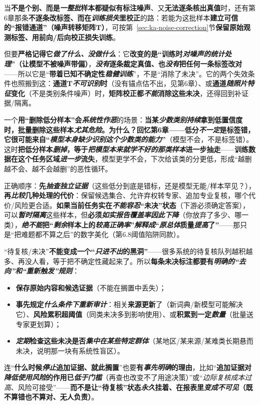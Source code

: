 当\textbf{不是个别、而是\emph{一整批}样本都疑似有标注噪声}、又\textbf{无法逐条核出真值}时，还有第6章那条\textbf{不逐条改标签、而在\emph{训练损失}里校正}的路：若能为这批样本\textbf{建立可信的“报错通道”（噪声转移矩阵$\bm T$）}，可按第~\ref{sec:ka-noise-correction}节\textbf{保留原始观测标签、用前向/后向校正损失训练}。

但要\textbf{严格记得它\emph{做了什么、没做什么}}：它\textbf{改变的是“训练时\emph{对噪声的\emph{统计处理}}”（让模型不被噪声带偏）}，\textbf{\emph{没有}逐条裁定真值、也\emph{没有}把任何一条标签改对}——所以它是“\textbf{带着已知不确定性\emph{稳健训练}}”，不是“消除了未决”。它的两个失效条件也照搬到这：\textbf{通道$\bm T$\emph{不可识别}时}（没有锚点估不出，见第6章）、或\textbf{通道\emph{随照片特征}变化}（不是类别条件噪声）时，\textbf{矩阵校正都\emph{不能}消除这些未决}，还得回到补证据/隔离。

一个\textbf{用“删除低分样本”会\emph{系统性作恶}}的场景：\textbf{当某\emph{少数类别}\emph{持续}拿到低置信度时，\textbf{批量删除这些样本\emph{尤其危险}}。为什么？回忆第6章——\textbf{低分\emph{不一定}是标签错}，它\textbf{很可能来自“\emph{模型本身\emph{缺少}识别这个少数类的能力}}”}（模型不会，不是标签错）。这时\textbf{把低分样本\emph{删掉}，等于\emph{把模型\emph{本来就学不好}的那类样本}进一步抽走}——\textbf{训练数据在这个任务区域\emph{进一步}流失}，模型更学不会，下次给该类的分更低，形成“越删越不会、越不会越删”的恶性循环。

正确顺序：\textbf{先\emph{抽查独立证据}}（这些低分到底是错标，还是模型无能/样本罕见？），\textbf{再\emph{比较}几种处理的代价}：保留候选集合、允许弃权转专家、追加专业复核，哪个代价/风险更合适。\textbf{如果当前任务实在\emph{不能容忍}“未决”状态}（下游必须确定答案），可以\textbf{\emph{暂时隔离}}这些样本，但\textbf{必须\emph{如实报告覆盖率因此下降}}（你放弃了多少、哪一类），\textbf{\emph{绝不能}把“\emph{剩余}样本上的\emph{较高正确率}”\emph{解释成}“\emph{原总体}质量\emph{提高}了”}——那只是“把难题都不算之后”的数字美化（第6.8阈值陷阱同款）。

“待复核/未决”\textbf{不能变成一个“\emph{只进不出}的黑洞”}——很多系统的待复核队列越积越多、再没人看，等于把不确定性藏起来了。所以\textbf{每条未决标注都要有\emph{明确的“去向”和“重新触发”规则}}：
\begin{itemize}\item \textbf{保存原始内容和候选证据}（不能在搁置中丢失）；\item \textbf{事先规定\emph{什么条件下重新审计}}：相关\textbf{来源更新}了（新词典/新模型可能解决它）、\textbf{风险累积超阈值}（同类未决多到影响使用）、或\textbf{积累到一定\emph{数量}}（批量送专家更划算）；\item \textbf{\emph{定期}检查这些未决是否\emph{集中在某些特定群体}}（某地区/某来源/某难类长期悬而未决，说明那一块有系统性盲区）。\end{itemize}
连“\textbf{什么时候\emph{停止}追加证据、就此搁置}”也要\textbf{有\emph{事先明确}的理由}，比如“\textbf{追加证据对\emph{降低使用风险}的作用已\emph{低于门槛}}（再查也改变不了用途决策）”或“\emph{边际复核成本过高}、风险可接受”——\textbf{而不是让“待复核”状态\emph{永久}挂着、在报表里\emph{变成不可见}（既不算错也不算对、无人负责）}。

